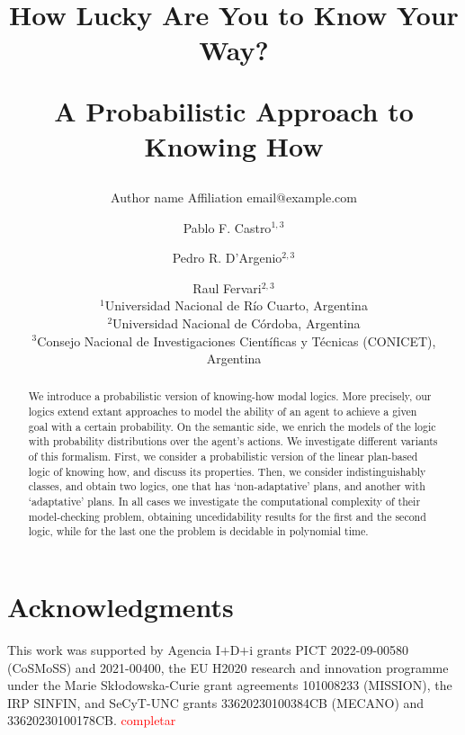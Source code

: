 \documentclass{article}
\title{How Lucky Are You to Know Your Way?\par A Probabilistic Approach to Knowing How} %
\author{%
    Author name
    \affiliations
    Affiliation
    \emails
    email@example.com    %
}
\author{%
Pablo F. Castro$^{1,3}$\and
Pedro R. D'Argenio$^{2,3}$\and
Raul Fervari$^{2,3}$ \\
\affiliations
$^1$Universidad Nacional de R\'io Cuarto, Argentina\\
$^2$Universidad Nacional de C\'ordoba, Argentina\\
$^3$Consejo Nacional de Investigaciones Cient\'ificas y T\'ecnicas (CONICET), Argentina\\
}
\begin{document}
\maketitle

\begin{abstract}
  We introduce a probabilistic version of knowing-how modal logics.  More precisely,  our logics extend extant approaches to model the ability of an agent to achieve a given goal with a certain probability.  On the semantic side,  we enrich the models of the logic with probability distributions over the agent's actions.  We investigate different variants of this formalism.  First,  we consider a probabilistic version of the linear plan-based logic of knowing how, and discuss its properties. Then, we consider indistinguishably classes,  and obtain two logics,  one that has `non-adaptative' plans, and another  with `adaptative' plans. In all cases we investigate the computational complexity of their model-checking problem, obtaining uncedidability results for the first and the second logic, while for the last one the problem is decidable in polynomial time.  
\end{abstract}







\section*{Acknowledgments}

This work was supported by Agencia I$+$D$+$i grants PICT 2022-09-00580
({\scriptsize CoSMoSS}) and 
2021-00400,
%
the EU H2020 research and innovation programme
under the Marie Sk{\l}odowska-Curie grant agreements 101008233
({\scriptsize MISSION}),
%
the IRP SINFIN, 
%
and SeCyT-UNC grants 33620230100384CB ({\scriptsize MECANO}) and 33620230100178CB.
%
\textcolor{red}{completar}











\appendix


\end{document}
